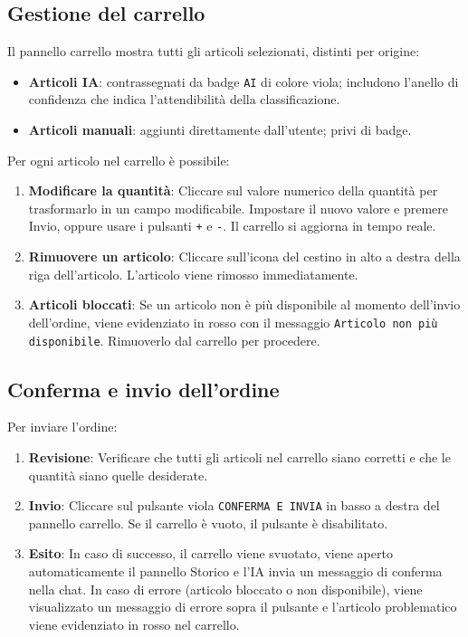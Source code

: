 \documentclass[a4paper, 11pt, oneside]{scrartcl}
\begin{document}
\subsection{Gestione del carrello}

Il pannello carrello mostra tutti gli articoli selezionati, distinti per origine:

\begin{itemize}
    \item \textbf{Articoli IA}: contrassegnati da badge \texttt{AI} di colore viola; includono l'anello di confidenza che indica l'attendibilit\`a della classificazione.
    \item \textbf{Articoli manuali}: aggiunti direttamente dall'utente; privi di badge.
\end{itemize}

Per ogni articolo nel carrello \`e possibile:

\begin{enumerate}
    \item \textbf{Modificare la quantit\`a}: Cliccare sul valore numerico della quantit\`a per trasformarlo in un campo modificabile. Impostare il nuovo valore e premere Invio, oppure usare i pulsanti \texttt{+} e \texttt{-}. Il carrello si aggiorna in tempo reale.
    \item \textbf{Rimuovere un articolo}: Cliccare sull'icona del cestino in alto a destra della riga dell'articolo. L'articolo viene rimosso immediatamente.
    \item \textbf{Articoli bloccati}: Se un articolo non \`e pi\`u disponibile al momento dell'invio dell'ordine, viene evidenziato in rosso con il messaggio \texttt{Articolo non pi\`u disponibile}. Rimuoverlo dal carrello per procedere.
\end{enumerate}

\subsection{Conferma e invio dell'ordine}

Per inviare l'ordine:

\begin{enumerate}
    \item \textbf{Revisione}: Verificare che tutti gli articoli nel carrello siano corretti e che le quantit\`a siano quelle desiderate.
    \item \textbf{Invio}: Cliccare sul pulsante viola \texttt{CONFERMA E INVIA} in basso a destra del pannello carrello. Se il carrello \`e vuoto, il pulsante \`e disabilitato.
    \item \textbf{Esito}: In caso di successo, il carrello viene svuotato, viene aperto automaticamente il pannello Storico e l'IA invia un messaggio di conferma nella chat. In caso di errore (articolo bloccato o non disponibile), viene visualizzato un messaggio di errore sopra il pulsante e l'articolo problematico viene evidenziato in rosso nel carrello.
\end{enumerate}
\end{document}
